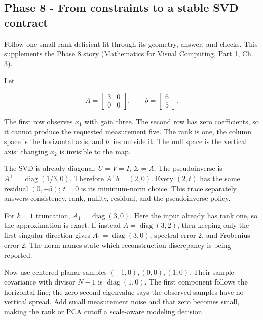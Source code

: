 \subsection{Phase 8 - From constraints to a stable SVD contract}\label{appendix-92ff77d4dfdc-phase-8---from-constraints-to-a-stable-svd-contract}

\hypertarget{appendix-92ff77d4dfdc-phase-8---from-constraints-to-a-stable-svd-contract}{}

Follow one small rank-deficient fit through its geometry, answer, and checks. This supplements \href{../02-Mathematics-for-Visual-Computing-P01/main.pdf\#nameddest=01-foundations-i-ch019-the-graphics-problem-hiding-inside-a-matrix-equation}{the Phase 8 story (Mathematics for Visual Computing, Part 1, Ch. 3)}.

Let

\[
A=\begin{bmatrix}3&0\\0&0\end{bmatrix},\qquad
b=\begin{bmatrix}6\\5\end{bmatrix}.
\]

The first row observes \(x_1\) with gain three. The second row has zero coefficients, so it cannot produce the requested measurement five. The rank is one, the column space is the horizontal axis, and \(b\) lies outside it. The null space is the vertical axis: changing \(x_2\) is invisible to the map.

The SVD is already diagonal: \(U=V=I\), \(\Sigma=A\). The pseudoinverse is \(A^+=\operatorname{diag}(1/3,0)\). Therefore \(A^+b=(2,0)\). Every \((2,t)\) has the same residual \((0,-5)\); \(t=0\) is its minimum-norm choice. This trace separately answers consistency, rank, nullity, residual, and the pseudoinverse policy.

For \(k=1\) truncation, \(A_1=\operatorname{diag}(3,0)\). Here the input already has rank one, so the approximation is exact. If instead \(A=\operatorname{diag}(3,2)\), then keeping only the first singular direction gives \(A_1=\operatorname{diag}(3,0)\), spectral error \(2\), and Frobenius error \(2\). The norm names state which reconstruction discrepancy is being reported.

Now use centered planar samples \((-1,0),(0,0),(1,0)\). Their sample covariance with divisor \(N-1\) is \(\operatorname{diag}(1,0)\). The first component follows the horizontal line; the zero second eigenvalue says the observed samples have no vertical spread. Add small measurement noise and that zero becomes small, making the rank or PCA cutoff a scale-aware modeling decision.

